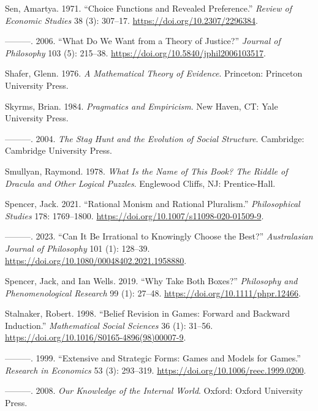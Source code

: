 \documentclass[
  12pt,
  letterpaper,
  DIV=11,
  numbers=noendperiod]{scrreprt}
\newlength{\cslhangindent}
\newenvironment{CSLReferences}[2] %
 {\begin{list}{}{%
  \setlength{\itemindent}{0pt}
  \setlength{\leftmargin}{0pt}
  \setlength{\parsep}{0pt}
  \ifodd #1
   \setlength{\leftmargin}{\cslhangindent}
   \setlength{\itemindent}{-1\cslhangindent}
  \fi
  \setlength{\itemsep}{#2\baselineskip}}}
 {\end{list}}
\begin{document}
\begin{CSLReferences}{1}{0}
Sen, Amartya. 1971. {``Choice Functions and Revealed Preference.''}
\emph{Review of Economic Studies} 38 (3): 307--17.
\url{https://doi.org/10.2307/2296384}.

---------. 2006. {``What Do We Want from a Theory of Justice?''}
\emph{Journal of Philosophy} 103 (5): 215--38.
\url{https://doi.org/10.5840/jphil2006103517}.

Shafer, Glenn. 1976. \emph{A Mathematical Theory of Evidence}.
Princeton: Princeton University Press.

Skyrms, Brian. 1984. \emph{Pragmatics and Empiricism}. New Haven, CT:
Yale University Press.

---------. 2004. \emph{The Stag Hunt and the Evolution of Social
Structure}. Cambridge: {C}ambridge {U}niversity {P}ress.

Smullyan, Raymond. 1978. \emph{What Is the Name of This Book? The Riddle
of Dracula and Other Logical Puzzles}. Englewood Cliffs, NJ:
Prentice-Hall.

Spencer, Jack. 2021. {``Rational Monism and Rational Pluralism.''}
\emph{Philosophical Studies} 178: 1769--1800.
\url{https://doi.org/10.1007/s11098-020-01509-9}.

---------. 2023. {``Can It Be Irrational to Knowingly Choose the
Best?''} \emph{Australasian Journal of Philosophy} 101 (1): 128--39.
\url{https://doi.org/10.1080/00048402.2021.1958880}.

Spencer, Jack, and Ian Wells. 2019. {``Why Take Both Boxes?''}
\emph{{P}hilosophy and {P}henomenological {R}esearch} 99 (1): 27--48.
\url{https://doi.org/10.1111/phpr.12466}.

Stalnaker, Robert. 1998. {``Belief Revision in Games: Forward and
Backward Induction.''} \emph{Mathematical Social Sciences} 36 (1):
31--56. \url{https://doi.org/10.1016/S0165-4896(98)00007-9}.

---------. 1999. {``Extensive and Strategic Forms: Games and Models for
Games.''} \emph{Research in Economics} 53 (3): 293--319.
\url{https://doi.org/10.1006/reec.1999.0200}.

---------. 2008. \emph{Our Knowledge of the Internal World}. Oxford:
Oxford University Press.


\end{CSLReferences}
\end{document}
